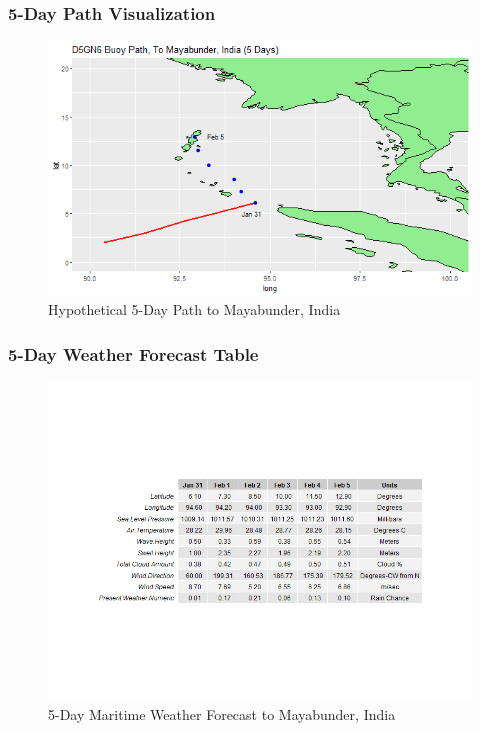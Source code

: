 \documentclass{article}
\begin{document}
\subsubsection*{5-Day Path Visualization}

\begin{figure}[h]
    \centering
    \includegraphics[scale = 0.45]{volume/mayabunderPath.PNG}
    \caption{Hypothetical 5-Day Path to Mayabunder, India}
    \label{fig:mayaPath}
\end{figure}

\newpage

\subsubsection*{5-Day Weather Forecast Table}

\begin{figure}[h]
    \centering
    \includegraphics[scale = 0.35]{volume/mayabunderForecastData.png}
    \caption{5-Day Maritime Weather Forecast to Mayabunder, India}
    \label{fig:mayaData}
\end{figure}
\end{document}
